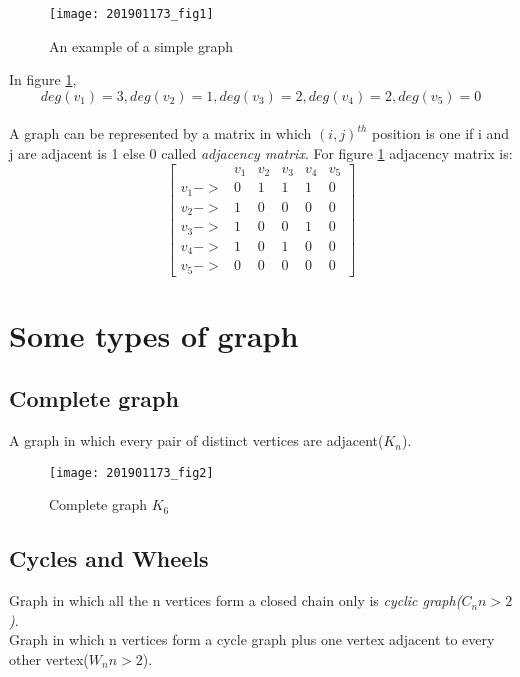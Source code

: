 \documentclass{article}
\begin{document}
\begin{figure}[h]
    \centering
    \texttt{[image: 201901173\_fig1]}
    \caption{An example of a simple graph}
    \label{fig:201901173_fig1}
\end{figure}

In figure \ref{fig:201901173_fig1},
\[deg(v_1)=3 , deg(v_2)=1 , deg(v_3)=2 , deg(v_4)=2 , deg(v_5)=0\]

\paragraph{}

A graph can be represented by a matrix in which $(i,j)^{th}$ position is one if i and j are adjacent is 1 else 0 called {\it adjacency matrix}. For figure \ref{fig:201901173_fig1} adjacency matrix is:
\[\begin{bmatrix}
&v_1&v_2&v_3&v_4&v_5\\
v_1->&0&1&1&1&0\\
v_2->&1&0&0&0&0\\
v_3->&1&0&0&1&0\\
v_4->&1&0&1&0&0\\
v_5->&0&0&0&0&0
\end{bmatrix}\]

\vspace{2cm}

\section{Some types of graph}
\subsection{Complete graph}
A graph in which every pair of distinct vertices are adjacent($K_n$).

\begin{figure}[h]
    \centering
    \texttt{[image: 201901173\_fig2]}
    \caption{Complete graph $K_6$}
    \label{fig:201901173_fig2}
\end{figure}

\subsection{Cycles and Wheels}
Graph in which all the n vertices form a closed chain only is {\it cyclic graph($C_n n > 2$)}.\\
Graph in which n vertices form a cycle graph plus one vertex adjacent to every other vertex($W_n n > 2$).
\end{document}
